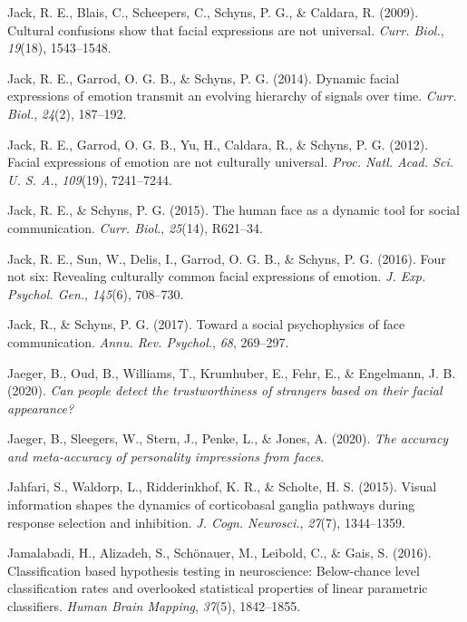 \documentclass[11pt,american,]{memoir} %
\begin{document}
\leavevmode\hypertarget{ref-Jack2009-yy}{}%
Jack, R. E., Blais, C., Scheepers, C., Schyns, P. G., \& Caldara, R. (2009). Cultural confusions show that facial expressions are not universal. \emph{Curr. Biol.}, \emph{19}(18), 1543--1548.

\leavevmode\hypertarget{ref-Jack2014-ku}{}%
Jack, R. E., Garrod, O. G. B., \& Schyns, P. G. (2014). Dynamic facial expressions of emotion transmit an evolving hierarchy of signals over time. \emph{Curr. Biol.}, \emph{24}(2), 187--192.

\leavevmode\hypertarget{ref-Jack2012-eq}{}%
Jack, R. E., Garrod, O. G. B., Yu, H., Caldara, R., \& Schyns, P. G. (2012). Facial expressions of emotion are not culturally universal. \emph{Proc. Natl. Acad. Sci. U. S. A.}, \emph{109}(19), 7241--7244.

\leavevmode\hypertarget{ref-Jack2015-sh}{}%
Jack, R. E., \& Schyns, P. G. (2015). The human face as a dynamic tool for social communication. \emph{Curr. Biol.}, \emph{25}(14), R621--34.

\leavevmode\hypertarget{ref-Jack2016-jq}{}%
Jack, R. E., Sun, W., Delis, I., Garrod, O. G. B., \& Schyns, P. G. (2016). Four not six: Revealing culturally common facial expressions of emotion. \emph{J. Exp. Psychol. Gen.}, \emph{145}(6), 708--730.

\leavevmode\hypertarget{ref-Jack2017-gt}{}%
Jack, R., \& Schyns, P. G. (2017). Toward a social psychophysics of face communication. \emph{Annu. Rev. Psychol.}, \emph{68}, 269--297.

\leavevmode\hypertarget{ref-Jaeger2020-sr}{}%
Jaeger, B., Oud, B., Williams, T., Krumhuber, E., Fehr, E., \& Engelmann, J. B. (2020). \emph{Can people detect the trustworthiness of strangers based on their facial appearance?}

\leavevmode\hypertarget{ref-Jaeger2020-bn}{}%
Jaeger, B., Sleegers, W., Stern, J., Penke, L., \& Jones, A. (2020). \emph{The accuracy and meta-accuracy of personality impressions from faces}.

\leavevmode\hypertarget{ref-Jahfari2015-ix}{}%
Jahfari, S., Waldorp, L., Ridderinkhof, K. R., \& Scholte, H. S. (2015). Visual information shapes the dynamics of corticobasal ganglia pathways during response selection and inhibition. \emph{J. Cogn. Neurosci.}, \emph{27}(7), 1344--1359.

\leavevmode\hypertarget{ref-jamalabadi2016classification}{}%
Jamalabadi, H., Alizadeh, S., Schönauer, M., Leibold, C., \& Gais, S. (2016). Classification based hypothesis testing in neuroscience: Below-chance level classification rates and overlooked statistical properties of linear parametric classifiers. \emph{Human Brain Mapping}, \emph{37}(5), 1842--1855.
\end{document}
